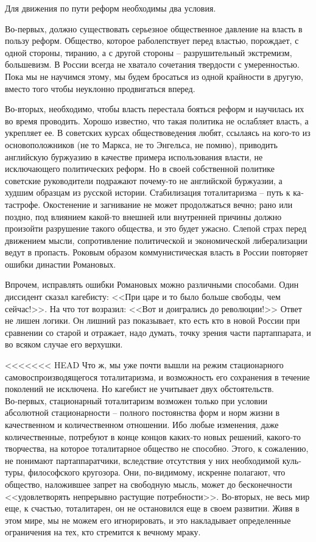 \documentclass{book}
\begin{document}
Для движения по пути реформ необходимы два условия.

Во-первых, должно существовать серьезное общественное давление на власть в пользу реформ. Общество, которое раболепствует перед властью, порождает, с одной стороны, тиранию, а с другой стороны -- разрушительный экстремизм, большевизм. В России всегда не хватало сочетания твердости с уме­ренностью. Пока мы не научимся этому, мы будем бросаться из одной крайности в другую, вместо того чтобы неуклонно продвигаться вперед.

Во-вторых, необходимо, чтобы власть перестала бояться реформ и научилась их во время проводить. Хорошо известно, что такая политика не ослабляет власть, а укрепляет ее. В советских курсах обществоведения любят, ссылаясь на кого-то из основоположников (не то Маркса, не то Энгельса, не помню), приводить английскую буржуазию в качестве примера использования власти, не исключающего политических реформ. Но в своей собственной политике советские руководители подра­жают почему-то не английской буржуазии, а худшим образцам из русской истории. Стабилизация тоталитаризма -- путь к ка­тастрофе. Окостенение и загнивание не может продолжаться вечно; рано или поздно, под влиянием какой-то внешней или внутренней причины должно произойти разрушение такого об­щества, и это будет ужасно. Слепой страх перед движением мысли, сопротивление политической и экономической либера­лизации ведут в пропасть. Роковым образом коммунистиче­ская власть в России повторяет ошибки династии Романовых.

Впрочем, исправлять ошибки Романовых можно различны­ми способами. Один диссидент сказал кагебисту: <<При царе и то было больше свободы, чем сейчас!>>. На что тот возразил: <<Вот и доигрались до революции!>> Ответ не лишен логики. Он лишний раз показывает, кто есть кто в новой России при сравнении со старой и отражает, надо думать, точку зрения части партаппарата, и во всяком случае его верхушки.

<<<<<<< HEAD
Что ж, мы уже почти вышли на режим стационарного самовоспроизводящегося тоталитаризма, и возможность его сохранения в течение поколений не исключена. Но кагебист не учитывает двух обстоятельств. Во‑первых, стационарный тоталитаризм возможен только при условии абсолютной  стационарности -- полного постоянства форм и норм жизни в качественном и количественном отношении. Ибо любые изменения, даже количественные, потребуют в конце концов каких‑то новых решений, какого‑то творчества, на которое тоталитарное общество не способно. Этого, к сожалению, не понимают партаппаратчики, вследствие отсутствия у них необходимой куль­туры, философского кругозора. Они, по‑видимому, искренне полагают, что общество, наложившее запрет на свободную мысль, может до бесконечности <<удовлетворять непрерывно растущие потребности>>. Во‑вторых, не весь мир еще, к счастью, тоталитарен, он не остановился еще в своем развитии. Живя в этом мире, мы не можем его игнорировать, и это накладывает определенные ограничения на тех, кто стремится к вечному мраку.
\end{document}
